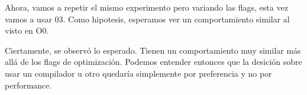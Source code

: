 Ahora, vamos a repetir el mismo experimento pero variando las flags, esta vez vamos a usar 03. Como hipotesis, esperamos ver un comportamiento similar al visto en O0.
\begin{figure}[H]
    \centering
    \begin{floatrow}
    \end{floatrow}
\end{figure}


\begin{figure}[H]
    \centering
    \begin{floatrow}
    \end{floatrow}
\end{figure}

Ciertamente, se observó lo esperado. Tienen un comportamiento muy similar más allá de los flags de optimización. Podemos entender entonces que la desición
sobre usar un compilador u otro quedaría simplemente por preferencia y no por performance.
